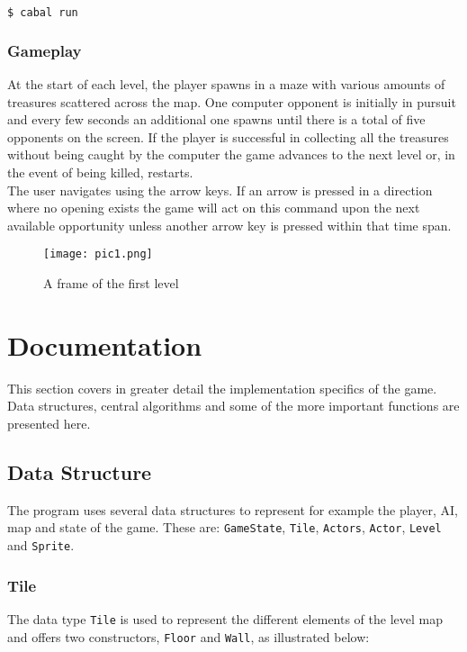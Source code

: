 \documentclass{article}
\begin{document}
   \begin{lstlisting}[language=Bash]
   $ cabal run
   \end{lstlisting}

   		\subsubsection{Gameplay}
   		At the start of each level, the player spawns in a maze with various amounts of treasures scattered across the map. One computer opponent is initially in pursuit and every few seconds an additional one spawns until there is a total of five opponents on the screen. If the player is successful in collecting all the treasures without being caught by the computer the game advances to the next level or, in the event of being killed, restarts.\\
   			\newline
		The user navigates using the arrow keys. If an arrow is pressed in a direction where no opening exists the game will act on this command upon the next available opportunity unless another arrow key is pressed within that time span.\\
\begin{figure}
\centering
\texttt{[image: pic1.png]}
\caption{A frame of the first level}
\end{figure}
\section{Documentation}
This section covers in greater detail the implementation specifics of the game. Data structures, central algorithms and some of the more important functions are presented here.

	\subsection{Data Structure}
    The program uses several data structures to represent for example the player, AI, map and state of the game. These are: \texttt{GameState}, \texttt{Tile}, \texttt{Actors}, \texttt{Actor}, \texttt{Level} and \texttt{Sprite}.

    	\subsubsection{Tile}
    	The data type \texttt{Tile} is used to represent the different elements of the level map and offers two constructors, \texttt{Floor} and \texttt{Wall}, as illustrated below:\\
\end{document}
